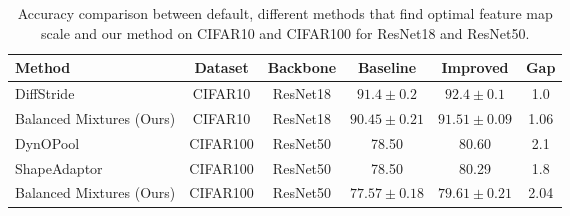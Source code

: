 \begin{table*}[!]
\caption{Accuracy comparison between default, different methods that find optimal feature map scale and our method on CIFAR10 and CIFAR100 for ResNet18 and ResNet50. }
    \vspace{-0.6cm}
    \footnotesize
    \begin{center}
        \begin{tabular}{ l c c c c c}
        
        Method & Dataset &  Backbone & Baseline & Improved & Gap\\ %
         \hline   
         \hline
         DiffStride \citep{riad2022learning} & CIFAR10 & ResNet18 & $91.4 \pm 0.2$ & $ 92.4 \pm 0.1$ & 1.0 \\%
         Balanced Mixtures (Ours) & CIFAR10 &  
         ResNet18 & $90.45 \pm 0.21 $ & $91.51 \pm 0.09$ & 1.06  \\
         \hline
        DynOPool\citep{jang2022pooling} & CIFAR100  & ResNet50 & 78.50 & 80.60 & 2.1\\
        ShapeAdaptor\citep{liu2020shape} & CIFAR100  & ResNet50 & 78.50 & 80.29 & 1.8\\
        Balanced Mixtures (Ours) & CIFAR100  & ResNet50 & $ 77.57 \pm 0.18$  & $79.61 \pm 0.21 $  & 2.04  \\%
        \end{tabular}
    
    \end{center}
\label{resolution-methods}
\vspace{-.8cm}
\end{table*}
